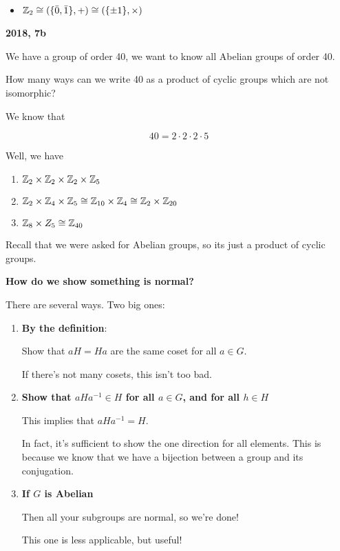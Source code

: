 \documentclass[12pt]{article}
\begin{document}
\begin{itemize}
  \item ${\mathbb Z}_2 \cong (\{\bar 0, \bar 1\}, +) \cong (\{\pm 1\}, \times)$
\end{itemize}

{\bf 2018, 7b}

We have a group of order 40, we want to know all Abelian groups of order 40.

How many ways can we write 40 as a product of cyclic groups which are not
isomorphic?

We know that

\[
  40 = 2 \cdot 2 \cdot 2 \cdot 5
\]

Well, we have
\begin{enumerate}
  \item ${\mathbb Z}_2 \times {\mathbb Z}_2 \times {\mathbb Z}_2 \times {\mathbb Z}_5$
  \item ${\mathbb Z}_2 \times {\mathbb Z}_4 \times {\mathbb Z}_5 \cong {\mathbb Z}_{10} \times {\mathbb Z}_4 \cong {\mathbb Z}_2
    \times {\mathbb Z}_{20}$
  \item ${\mathbb Z}_8 \times Z_5 \cong {\mathbb Z}_{40}$
\end{enumerate}

Recall that we were asked for Abelian groups, so its just a product of cyclic
groups.

{\bf How do we show something is normal?}

There are several ways. Two big ones:

\begin{enumerate}
  \item {\bf By the definition}:

    Show that $aH = Ha$ are the same coset for all $a \in G$.

    If there's not many cosets, this isn't too bad.

  \item {\bf Show that $aHa^{-1} \in H$ for all $a \in G$, and for all $h \in H$}

    This implies that $aHa^{-1} = H$.

    In fact, it's sufficient to show the one direction for all elements. This is
    because we know that we have a bijection between a group and its
    conjugation.

  \item {\bf If $G$ is Abelian}

    Then all your subgroups are normal, so we're done!

    This one is less applicable, but useful!
\end{enumerate}
\end{document}

